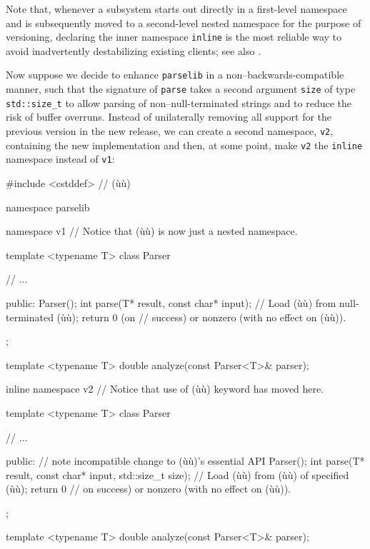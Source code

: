 Note that, whenever a subsystem starts out directly in a first-level
namespace and is subsequently moved to a second-level nested namespace
for the purpose of versioning, declaring the inner namespace
\lstinline!inline! is the most reliable way to avoid inadvertently
destabilizing existing clients; see also .

Now suppose we decide to enhance \lstinline!parselib! in a
non--backwards-compatible manner, such that the signature of
\lstinline!parse! takes a second argument \lstinline!size! of type
\lstinline!std::size_t! to allow parsing of non--null-terminated strings
and to reduce the risk of buffer overruns. Instead of unilaterally
removing all support for the previous version in the new release, we can
create a second namespace, \lstinline!v2!, containing the new
implementation and then, at some point, make \lstinline!v2! the
\lstinline!inline! namespace instead of \lstinline!v1!:

\begin{emcppslisting}
#include <cstddef>  // (ù{}ù)

namespace parselib
{
    namespace v1  // Notice that (ù{}ù) is now just a nested namespace.
    {
        template <typename T>
        class Parser
        {
            // ...

        public:
            Parser();
            int parse(T* result, const char* input);
                // Load (ù{}ù) from null-terminated (ù{}ù); return 0 (on
                // success) or nonzero (with no effect on (ù{}ù)).
        };

        template <typename T>
        double analyze(const Parser<T>& parser);
    }

    inline namespace v2    // Notice that use of (ù{}ù) keyword has moved here.
    {
        template <typename T>
        class Parser
        {
            // ...

        public:  // note incompatible change to (ù{}ù)'s essential API
            Parser();
            int parse(T* result, const char* input, std::size_t size);
                // Load (ù{}ù) from (ù{}ù) of specified (ù{}ù); return 0
                // on success) or nonzero (with no effect on (ù{}ù)).
        };

        template <typename T>
        double analyze(const Parser<T>& parser);
    }
}
\end{emcppslisting}

